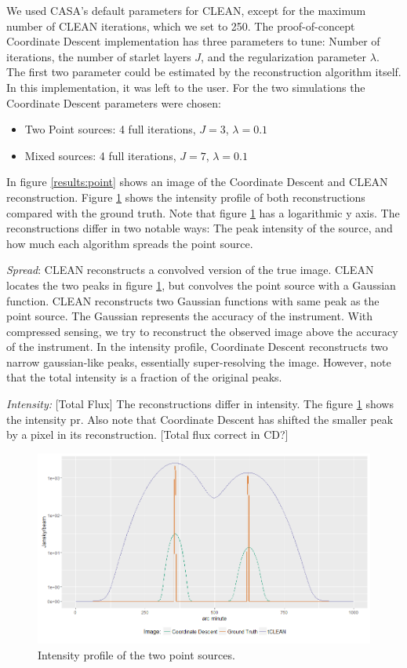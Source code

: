 We used CASA's default parameters for CLEAN, except for the maximum number of CLEAN iterations, which we set to 250. The proof-of-concept Coordinate Descent implementation has three parameters to tune: Number of iterations, the number of starlet layers $J$, and the regularization parameter $\lambda$. The first two parameter could be estimated by the reconstruction algorithm itself. In this implementation, it was left to the user. For the two simulations the Coordinate Descent parameters were chosen:
\begin{itemize}
	\item Two Point sources: 4 full iterations, $J=3$, $\lambda=0.1$
	\item Mixed sources: 4 full iterations, $J=7$, $\lambda=0.1$
\end{itemize}

In figure \ref{results:point} shows an image of the Coordinate Descent and CLEAN reconstruction. Figure \ref{results:points:contour} shows the intensity profile of both reconstructions compared with the ground truth. Note that figure \ref{results:points:contour} has a logarithmic y axis. The reconstructions differ in two notable ways: The peak intensity of the source, and how much each algorithm spreads the point source. 

\textit{Spread}: CLEAN reconstructs a convolved version of the true image. CLEAN locates the two peaks in figure \ref{results:points:contour}, but convolves the point source with a Gaussian function. CLEAN reconstructs two Gaussian functions with same peak as the point source. The Gaussian represents the accuracy of the instrument. With compressed sensing, we try to reconstruct the observed image above the accuracy of the instrument. In the intensity profile, Coordinate Descent reconstructs two narrow gaussian-like peaks, essentially super-resolving the image. However, note that the total intensity is a fraction of the original peaks.

\textit{Intensity:} [Total Flux] The reconstructions differ in intensity. The figure \ref{results:points:contour} shows the intensity pr. Also note that Coordinate Descent has shifted the smaller peak by a pixel in its reconstruction. [Total flux correct in CD?]

\begin{figure}[h]
	\centering
	\includegraphics[width=0.8\linewidth]{./chapters/20.results/points/line.png}
	\caption{Intensity profile of the two point sources.}
	\label{results:points:contour}
\end{figure}

